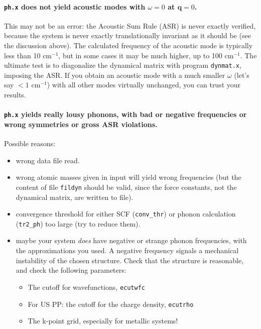 \documentclass[12pt,a4paper]{article}
\begin{document}
\paragraph{\texttt{ph.x} does not yield acoustic modes with $\omega=0$
           at $\mathbf{q}=0$.}

This may not be an error: the Acoustic Sum Rule (ASR) is never exactly
verified, because the system is never exactly translationally
invariant as it should be (see the discussion above).
The calculated frequency of the acoustic mode is typically less than
10 cm$^{-1}$, but in some cases it may be much higher, up to 100
cm$^{-1}$.
The ultimate test is to diagonalize the dynamical matrix with program
\texttt{dynmat.x}, imposing the ASR.
If you obtain an acoustic mode with a much smaller $\omega$ (let's say
$<1$ cm$^{-1}$) with all other modes virtually unchanged, you
can trust your results.

\paragraph{\texttt{ph.x} yields really lousy phonons, with bad or
           negative frequencies or wrong symmetries or gross ASR
           violations.}

Possible reasons:
\begin{itemize}
  \item
    wrong data file read.
  \item
    wrong atomic masses given in input will yield wrong frequencies
    (but the content of file {\tt fildyn} should be valid, since the
    force constants, not the dynamical matrix, are written to file).
  \item
    convergence threshold for either SCF ({\tt conv\_thr}) or phonon
    calculation ({\tt tr2\_ph}) too large (try to reduce them).
  \item
    maybe your system \emph{does} have negative or strange phonon
    frequencies, with the approximations you used.
    A negative frequency signals a mechanical instability of the
    chosen structure.
    Check that the structure is reasonable, and check the following
    parameters:
    \begin{itemize}
      \item The cutoff for wavefunctions, \texttt{ecutwfc}
      \item For US PP: the cutoff for the charge density,
            \texttt{ecutrho}
      \item The k-point grid, especially for metallic systems!
    \end{itemize}
\end{itemize}
\end{document}
